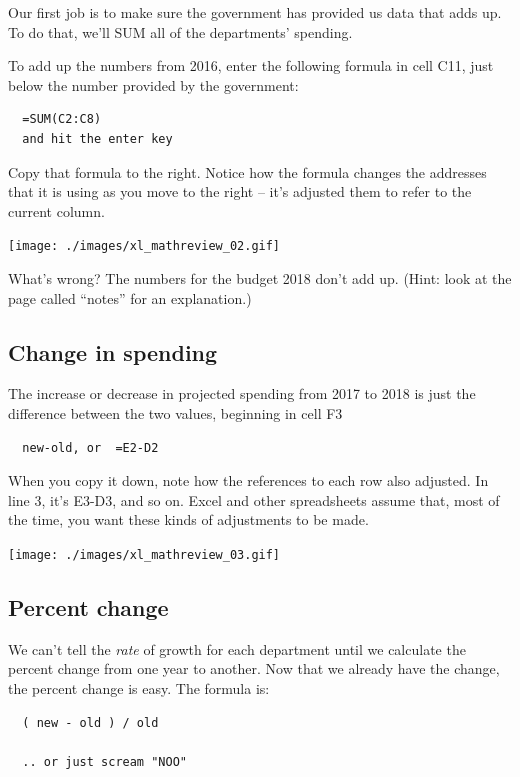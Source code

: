 \documentclass[
  letterpaper,
  DIV=11,
  numbers=noendperiod]{scrreprt}
\begin{document}
Our first job is to make sure the government has provided us data that
adds up. To do that, we'll SUM all of the departments' spending.

To add up the numbers from 2016, enter the following formula in cell
C11, just below the number provided by the government:

\begin{verbatim}
  =SUM(C2:C8)
  and hit the enter key
\end{verbatim}

Copy that formula to the right. Notice how the formula changes the
addresses that it is using as you move to the right -- it's adjusted
them to refer to the current column.

\texttt{[image: ./images/xl\_mathreview\_02.gif]}

What's wrong? The numbers for the budget 2018 don't add up. (Hint: look
at the page called ``notes'' for an explanation.)

\hypertarget{change-in-spending}{%
\subsection{Change in spending}\label{change-in-spending}}

The increase or decrease in projected spending from 2017 to 2018 is just
the difference between the two values, beginning in cell F3

\begin{verbatim}
  new-old, or  =E2-D2
\end{verbatim}

When you copy it down, note how the references to each row also
adjusted. In line 3, it's E3-D3, and so on. Excel and other spreadsheets
assume that, most of the time, you want these kinds of adjustments to be
made.

\texttt{[image: ./images/xl\_mathreview\_03.gif]}

\hypertarget{percent-change}{%
\subsection{Percent change}\label{percent-change}}

We can't tell the \emph{rate} of growth for each department until we
calculate the percent change from one year to another. Now that we
already have the change, the percent change is easy. The formula is:

\begin{verbatim}
  ( new - old ) / old

  .. or just scream "NOO"
\end{verbatim}
\end{document}
